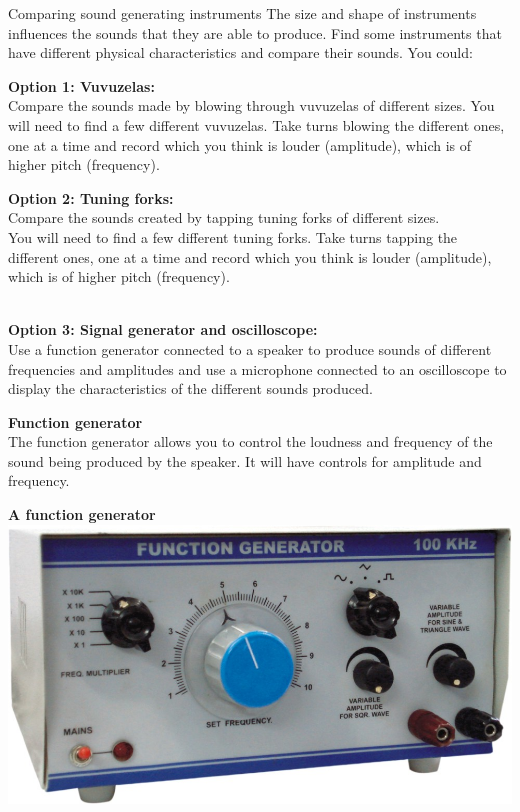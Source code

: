 \begin{activity}{Comparing sound generating instruments}
The size and shape of instruments influences the sounds that they are able to produce. Find some instruments that have different physical characteristics and compare their sounds. You could:\par\vspace{1em}
\begin{minipage}{.45\textwidth}
\textbf{Option 1: Vuvuzelas:}\\
Compare the sounds made by blowing through vuvuzelas of different sizes.
You will need to find a few different vuvuzelas. Take turns blowing the different ones, one at a time and record which you think is louder (amplitude), which is of higher pitch (frequency).
\end{minipage}\hspace{.1\textwidth}
\begin{minipage}{.45\textwidth}
\textbf{Option 2: Tuning forks:}\\
Compare the sounds created by tapping tuning forks of different sizes.\\
You will need to find a few different tuning forks. Take turns tapping the different ones, one at a time and record which you think is louder (amplitude), which is of higher pitch (frequency).
\end{minipage}\\
\vspace{1em}
\noindent
\textbf{Option 3: Signal generator and oscilloscope:}\\
Use a function generator connected to a speaker to produce sounds of different frequencies and amplitudes and use a microphone connected to an oscilloscope to display the characteristics of the different sounds produced. \\
\begin{minipage}{.5\textwidth}
\textbf{Function generator}\\
The function generator allows you to control the loudness and frequency of the sound being produced by the speaker. It will have controls for amplitude and frequency.\\
\end{minipage}
\begin{minipage}{.5\textwidth}
\begin{center}
\textbf{A function generator}\\
\includegraphics[width=.8\textwidth]{photos/function_generator.jpg}\\

\end{center}
\end{minipage}
\end{activity}
